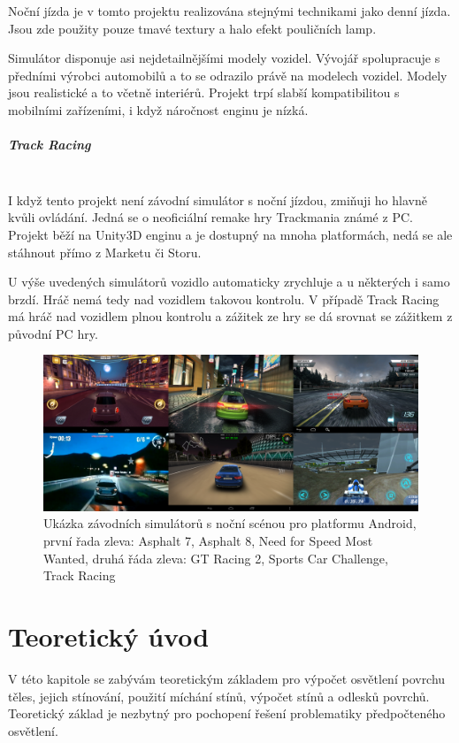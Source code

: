\documentclass[11pt,twoside,a4paper]{book}
\begin{document}
Noční jízda je v tomto projektu realizována stejnými technikami jako denní jízda. Jsou zde použity pouze tmavé textury a halo efekt pouličních lamp.

Simulátor disponuje asi nejdetailnějšími modely vozidel. Vývojář spolupracuje s předními výrobci automobilů a to se odrazilo právě na modelech vozidel. Modely jsou realistické a to včetně interiérů. Projekt trpí slabší kompatibilitou s mobilními zařízeními, i když náročnost enginu je nízká.

\paragraph{Track Racing}\mbox{}\\

I když tento projekt není závodní simulátor s noční jízdou, zmiňuji ho hlavně kvůli ovládání. Jedná se o neoficiální remake hry Trackmania známé z PC. Projekt běží na Unity3D enginu a je dostupný na mnoha platformách, nedá se ale stáhnout přímo z Marketu či Storu.

U výše uvedených simulátorů vozidlo automaticky zrychluje a u některých i samo brzdí. Hráč nemá tedy nad vozidlem takovou kontrolu. V případě Track Racing má hráč nad vozidlem plnou kontrolu a zážitek ze hry se dá srovnat se zážitkem z původní PC hry.

\begin{center}
\begin{figure}[h!]
\includegraphics[width=150mm]{figures/games.png}
\caption{Ukázka závodních simulátorů s noční scénou pro platformu Android, první řada zleva: Asphalt 7, Asphalt 8, Need for Speed Most Wanted, druhá řáda zleva: GT Racing 2, Sports Car Challenge, Track Racing}
\end{figure}
\end{center}

\chapter{Teoretický úvod}
V této kapitole se zabývám teoretickým základem pro výpočet osvětlení povrchu těles, jejich stínování, použití míchání stínů, výpočet stínů a odlesků povrchů. Teoretický základ je nezbytný pro pochopení řešení problematiky předpočteného osvětlení.
\end{document}
